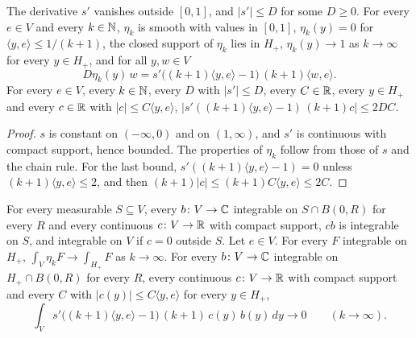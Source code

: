 \begin{lemma}
\label{lem:half-space-cutoffs}
\leanok
{}
The derivative $s'$ vanishes outside $[0, 1]$, and $|s'| \leq D$ for some $D \geq 0$. For every
$e \in V$ and every $k \in \mathbb{N}$, $\eta_k$ is smooth with values in $[0, 1]$, $\eta_k(y) = 0$ for
$\langle y, e \rangle \leq 1/(k + 1)$, the closed support of $\eta_k$ lies in $H_+$,
$\eta_k(y) \to 1$ as $k \to \infty$ for every $y \in H_+$, and for all $y, w \in V$
\[
  D\eta_k(y) \, w = s'\bigl((k + 1) \langle y, e \rangle - 1\bigr) \, (k + 1) \langle w, e \rangle .
\]
For every $e \in V$, every $k \in \mathbb{N}$, every $D$ with $|s'| \leq D$, every $C \in \mathbb{R}$, every
$y \in H_+$ and every $c \in \mathbb{R}$ with $|c| \leq C \langle y, e \rangle$,
$|s'((k + 1) \langle y, e \rangle - 1) \, (k + 1) c| \leq 2 D C$.
\end{lemma}

\begin{proof}
\leanok
$s$ is constant on $(-\infty, 0)$ and on $(1, \infty)$, and $s'$ is continuous with compact
support, hence bounded. The properties of $\eta_k$ follow from those of $s$ and the chain rule.
For the last bound, $s'((k + 1) \langle y, e \rangle - 1) = 0$ unless
$(k + 1) \langle y, e \rangle \leq 2$, and then $(k + 1) |c| \leq (k + 1) C \langle y, e \rangle
\leq 2 C$.
\end{proof}

\begin{lemma}
\label{lem:half-space-cutoff-limits}
\leanok
{}
For every measurable $S \subseteq V$, every $b \colon V \to \mathbb{C}$ integrable on $S \cap B(0, R)$ for
every $R$ and every continuous $c \colon V \to \mathbb{R}$ with compact support, $c b$ is integrable on
$S$, and integrable on $V$ if $c = 0$ outside $S$. Let $e \in V$. For every $F$ integrable on
$H_+$, $\int_V \eta_k F \to \int_{H_+} F$ as $k \to \infty$. For every $b \colon V \to \mathbb{C}$
integrable on $H_+ \cap B(0, R)$ for every $R$, every continuous $c \colon V \to \mathbb{R}$ with compact
support and every $C$ with $|c(y)| \leq C \langle y, e \rangle$ for every $y \in H_+$,
\[
  \int_V s'\bigl((k + 1) \langle y, e \rangle - 1\bigr) \, (k + 1) \, c(y) \, b(y) \, dy \to 0
  \qquad (k \to \infty) .
\]
\end{lemma}

